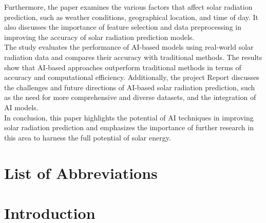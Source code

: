 \documentclass[12pt,a4paper]{report}
\begin{document}
Furthermore, the paper examines the various factors that affect solar radiation prediction, such as weather conditions, geographical location, and time of day. It also discusses the importance of feature selection and data preprocessing in improving the accuracy of solar radiation prediction models. \\
The study evaluates the performance of AI-based models using real-world solar radiation data and compares their accuracy with traditional methods. The results show that AI-based approaches outperform traditional methods in terms of accuracy and computational efficiency. Additionally, the project Report discusses the 
challenges and future directions of AI-based solar radiation prediction, such as the need for more comprehensive and diverse datasets, and the integration of AI 
models. \\
In conclusion, this paper highlights the potential of AI techniques in improving solar radiation prediction and emphasizes the importance of further research in this area to harness the full potential of solar energy. 
\clearpage
\tableofcontents
\listoffigures
{}
\chapter*{List of Abbreviations}
\begin{acronym}[TDMA]
\setlength{\itemsep}{-\parsep}
\end{acronym}
\chapter{Introduction}
\setcounter{page}{1}
\end{document}
